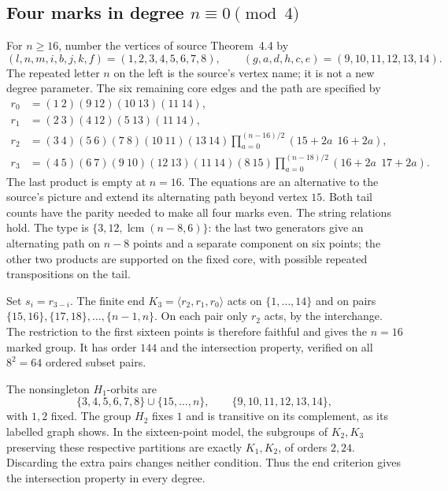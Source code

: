 \documentclass[11pt]{article}
\newcommand{\gen}[1]{\langle #1\rangle}
\begin{document}
\subsection{Four marks in degree $n\equiv0\pmod4$}
For $n\geq16$, number the vertices of source Theorem~4.4 by
\[
 (l,n,m,i,b,j,k,f)=(1,2,3,4,5,6,7,8),\qquad
 (g,a,d,h,c,e)=(9,10,11,12,13,14).
\]
The repeated letter $n$ on the left is the source's vertex name; it is
not a new degree parameter. The six remaining core edges and the path
are specified by
\begin{align*}
 r_0&=(1\ 2)(9\ 12)(10\ 13)(11\ 14),\\
 r_1&=(2\ 3)(4\ 12)(5\ 13)(11\ 14),\\
 r_2&=(3\ 4)(5\ 6)(7\ 8)(10\ 11)(13\ 14)
          \prod_{a=0}^{(n-16)/2}(15+2a\ \ 16+2a),\\
 r_3&=(4\ 5)(6\ 7)(9\ 10)(12\ 13)(11\ 14)(8\ 15)
          \prod_{a=0}^{(n-18)/2}(16+2a\ \ 17+2a).
\end{align*}
The last product is empty at $n=16$. The equations are an alternative
to the source's picture and extend its alternating path beyond vertex
$15$. Both tail counts have the parity needed to make all four marks
even. The string relations hold. The type is
$\{3,12,\operatorname{lcm}(n-8,6)\}$: the last two generators give
an alternating path on $n-8$ points and a separate component on six
points; the other two products are supported on the fixed core, with
possible repeated transpositions on the tail.

Set $s_i=r_{3-i}$. The finite end $K_3=\gen{r_2,r_1,r_0}$ acts on
$\{1,\ldots,14\}$ and on pairs
$\{15,16\},\{17,18\},\ldots,\{n-1,n\}$. On each pair only
$r_2$ acts, by the interchange. The restriction to the first sixteen
points is therefore faithful and gives the $n=16$ marked group.
It has order $144$ and the intersection property, verified on all
$8^2=64$ ordered subset pairs.

The nonsingleton $H_1$-orbits are
\[
 \{3,4,5,6,7,8\}\cup\{15,\ldots,n\},\qquad
 \{9,10,11,12,13,14\},
\]
with $1,2$ fixed. The group $H_2$ fixes $1$ and is transitive on its
complement, as its labelled graph shows. In the sixteen-point model,
the subgroups of $K_2,K_3$ preserving these respective partitions are
exactly $K_1,K_2$, of orders $2,24$. Discarding the extra pairs changes
neither condition. Thus the end criterion gives the intersection
property in every degree.
\end{document}
